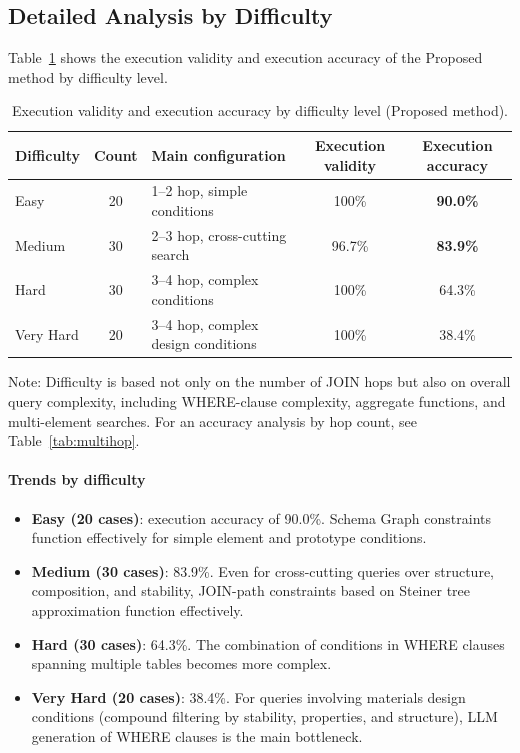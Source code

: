 \documentclass[5p,twocolumn]{elsarticle}
\begin{document}
\subsection{Detailed Analysis by Difficulty}

Table~\ref{tab:difficulty_breakdown} shows the execution validity and execution accuracy of the Proposed method by difficulty level.

\begin{table}[htbp]
  \centering
  \caption{Execution validity and execution accuracy by difficulty level (Proposed method).}
  \label{tab:difficulty_breakdown}
  \small
  \begin{tabular}{lclcc}
    \toprule
    Difficulty & Count & Main configuration & Execution validity & Execution accuracy \\
    \midrule
    Easy & 20 & 1--2 hop, simple conditions & 100\% & \textbf{90.0\%} \\
    Medium & 30 & 2--3 hop, cross-cutting search & 96.7\% & \textbf{83.9\%} \\
    Hard & 30 & 3--4 hop, complex conditions & 100\% & 64.3\% \\
    Very Hard & 20 & 3--4 hop, complex design conditions & 100\% & 38.4\% \\
    \bottomrule
  \end{tabular}
  \vspace{2pt}
  \parbox{\linewidth}{\scriptsize
    Note: Difficulty is based not only on the number of JOIN hops but also on overall query complexity, including WHERE-clause complexity, aggregate functions, and multi-element searches.
    For an accuracy analysis by hop count, see Table~\ref{tab:multihop}.}
\end{table}

\paragraph{Trends by difficulty}

\begin{itemize}
  \item \textbf{Easy (20 cases)}: execution accuracy of 90.0\%.
    Schema Graph constraints function effectively for simple element and prototype conditions.
  \item \textbf{Medium (30 cases)}: 83.9\%.
    Even for cross-cutting queries over structure, composition, and stability,
    JOIN-path constraints based on Steiner tree approximation function effectively.
  \item \textbf{Hard (30 cases)}: 64.3\%. The combination of conditions in WHERE clauses spanning multiple tables becomes more complex.
  \item \textbf{Very Hard (20 cases)}: 38.4\%. For queries involving materials design conditions (compound filtering by stability, properties, and structure),
    LLM generation of WHERE clauses is the main bottleneck.
\end{itemize}
\end{document}
